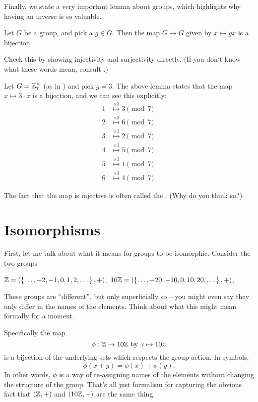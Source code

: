 Finally, we state a very important lemma about groups,
which highlights why having an inverse is so valuable.
\begin{lemma}
	Let $G$ be a group, and pick a $g \in G$. 
	Then the map $G \to G$ given by $x \mapsto gx$ is a bijection.
	\label{lem:group_mult_biject}
\end{lemma}
\begin{exercise}
	Check this by showing injectivity and surjectivity directly.
	(If you don't know what these words mean, consult .)
\end{exercise}
\begin{example}
	Let $G = \mathbb Z_{7}^\times$ (as in ) and pick $g=3$.
	The above lemma states that the map $x \mapsto 3 \cdot x$ is a bijection, and we can see this explicitly:
	\begin{align*}
		1 &\overset{\times 3}{\longmapsto} 3 \pmod 7 \\
		2 &\overset{\times 3}{\longmapsto} 6 \pmod 7 \\
		3 &\overset{\times 3}{\longmapsto} 2 \pmod 7 \\
		4 &\overset{\times 3}{\longmapsto} 5 \pmod 7 \\
		5 &\overset{\times 3}{\longmapsto} 1 \pmod 7 \\
		6 &\overset{\times 3}{\longmapsto} 4 \pmod 7.
	\end{align*}
\end{example}


The fact that the map is injective is often called the .
(Why do you think so?)

\section{Isomorphisms}
First, let me talk about what it means for groups to be isomorphic.
Consider the two groups
\begin{itemize}
	\ii $\mathbb Z = (\left\{ \dots,-2,-1,0,1,2,\dots \right\}, +)$.
	\ii $10\mathbb Z = (\left\{ \dots, -20, -10, 0, 10, 20, \dots \right\}, +)$.
\end{itemize}
These groups are ``different'', but only superficially so -- you might even say they only differ in the names of the elements.
Think about what this might mean formally for a moment.

Specifically the map
\[ \phi : \mathbb Z \to 10 \mathbb Z  \text{ by } x \mapsto 10 x \]
is a bijection of the underlying sets which respects the group action.
In symbols,
\[ \phi(x + y) = \phi(x) + \phi(y). \]
In other words, $\phi$ is a way of re-assigning names of the elements
without changing the structure of the group.
That's all just formalism for
capturing the obvious fact that $(\mathbb Z,+)$
and $(10 \mathbb Z, +)$ are the same thing.

